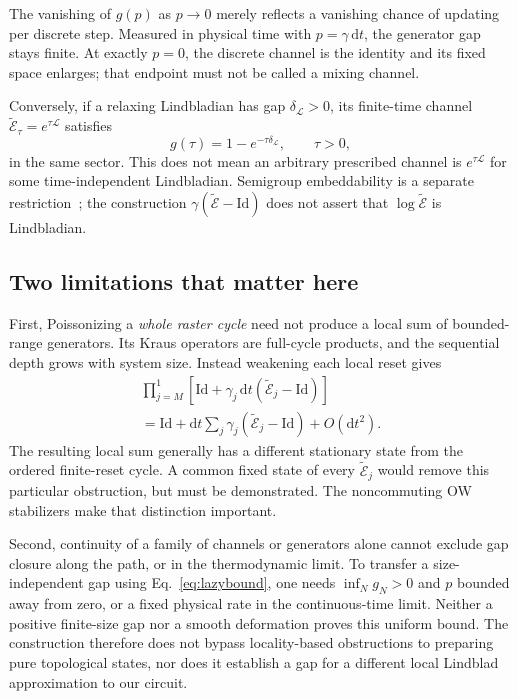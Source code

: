 \documentclass[aps,prb,twocolumn,nofootinbib,superscriptaddress]{revtex4-2}
\newcommand{\E}{\widetilde{\mathcal E}}
\newcommand{\Lind}{\mathcal L}
\begin{document}
The vanishing of $g(p)$ as $p\to0$ merely reflects a vanishing chance of
updating per discrete step. Measured in physical time with
$p=\gamma\,\mathrm dt$, the generator gap stays finite. At exactly
$p=0$, the discrete channel is the identity and its fixed space enlarges;
that endpoint must not be called a mixing channel.

Conversely, if a relaxing Lindbladian has gap $\delta_{\Lind}>0$, its
finite-time channel $\E_\tau=e^{\tau\Lind}$ satisfies
\begin{equation}
 g(\tau)=1-e^{-\tau\delta_{\Lind}},\qquad\tau>0,
\end{equation}
in the same sector. This does not mean an arbitrary prescribed channel
is $e^{\tau\Lind}$ for some time-independent Lindbladian. Semigroup
embeddability is a separate restriction~\cite{PRZ}; the construction
$\gamma(\E-\mathrm{Id})$ does not assert that $\log\E$ is Lindbladian.

\subsection{Two limitations that matter here}
First, Poissonizing a \emph{whole raster cycle} need not produce a local
sum of bounded-range generators. Its Kraus operators are full-cycle
products, and the sequential depth grows with system size. Instead
weakening each local reset gives
\begin{equation}
 \begin{aligned}
 \prod_{j=M}^{1}\left[\mathrm{Id}
 +\gamma_j\,\mathrm dt(\E_j-\mathrm{Id})\right]\\
 =\mathrm{Id}+\mathrm dt\sum_j\gamma_j(\E_j-\mathrm{Id})
 +O(\mathrm dt^2).
 \end{aligned}
\end{equation}
The resulting local sum generally has a different stationary state from
the ordered finite-reset cycle. A common fixed state of every $\E_j$
would remove this particular obstruction, but must be demonstrated.
The noncommuting OW stabilizers make that distinction important.

Second, continuity of a family of channels or generators alone cannot
exclude gap closure along the path, or in the thermodynamic limit.
To transfer a size-independent gap using Eq.~\eqref{eq:lazybound}, one
needs $\inf_N g_N>0$ and $p$ bounded away from zero, or a fixed physical
rate in the continuous-time limit. Neither a positive finite-size gap
nor a smooth deformation proves this uniform bound. The construction
therefore does not bypass locality-based obstructions to preparing pure
topological states, nor does it establish a gap for a different local
Lindblad approximation to our circuit.
\end{document}

